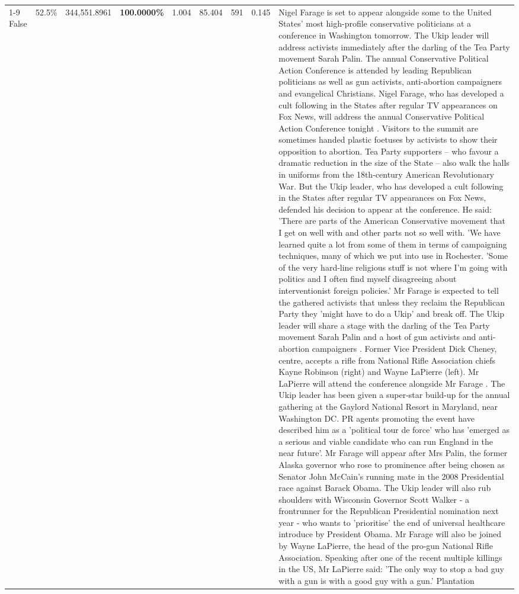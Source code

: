 \begin{table}[H]
\begin{tabular}{lllrlllll}
\cline{1-9} \cline{2-9}
False & 52.5\% & 344,551.8961 & \bfseries \color{red} 100.0000\% & 1.004 & 85.404 & 591 & 0.145 & Nigel Farage is set to appear alongside some to the United States' most high-profile conservative politicians at a conference in Washington tomorrow. The Ukip leader will address activists immediately after the darling of the Tea Party movement Sarah Palin. The annual Conservative Political Action Conference is attended by leading Republican politicians as well as gun activists, anti-abortion campaigners and evangelical Christians. Nigel Farage, who has developed a cult following in the States after regular TV appearances on Fox News, will address the annual Conservative Political Action Conference tonight . Visitors to the summit are sometimes handed plastic foetuses by activists to show their opposition to abortion. Tea Party supporters – who favour a dramatic reduction in the size of the State – also walk the halls in uniforms from the 18th-century American Revolutionary War. But the Ukip leader, who has developed a cult following in the States after regular TV appearances on Fox News, defended his decision to appear at the conference. He said: 'There are parts of the American Conservative movement that I get on well with and other parts not so well with. 'We have learned quite a lot from some of them in terms of campaigning techniques, many of which we put into use in Rochester. 'Some of the very hard-line religious stuff is not where I'm going with politics and I often find myself disagreeing about interventionist foreign policies.' Mr Farage is expected to tell the gathered activists that unless they reclaim the Republican Party they 'might have to do a Ukip' and break off. The Ukip leader will share a stage with the darling of the Tea Party movement Sarah Palin and a host of gun activists and anti-abortion campaigners . Former Vice President Dick Cheney, centre, accepts a rifle from National Rifle Association chiefs Kayne Robinson (right) and Wayne LaPierre (left). Mr LaPierre will attend the conference alongside Mr Farage . The Ukip leader has been given a super-star build-up for the annual gathering at the Gaylord National Resort in Maryland, near Washington DC. PR agents promoting the event have described him as a 'political tour de force' who has 'emerged as a serious and viable candidate who can run England in the near future'. Mr Farage will appear after Mrs Palin, the former Alaska governor who rose to prominence after being chosen as Senator John McCain's running mate in the 2008 Presidential race against Barack Obama. The Ukip leader will also rub shoulders with Wisconsin Governor Scott Walker - a frontrunner for the Republican Presidential nomination next year - who wants to 'prioritise' the end of universal healthcare introduce by President Obama. Mr Farage will also be joined by Wayne LaPierre, the head of the pro-gun National Rifle Association. Speaking after one of the recent multiple killings in the US, Mr LaPierre said: 'The only way to stop a bad guy with a gun is with a good guy with a gun.' Plantation \\

\end{tabular}
\end{table}
